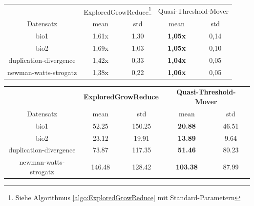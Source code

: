 \documentclass[12pt,a4paper,onecolumn,oneside,titlepage]{article}
\begin{document}
\begin{center}
\label{tab:qual_mover}
\begin{tabular}{c|c c|c c}
& \multicolumn{2}{c|}{ExploredGrowReduce\footnote{Siehe Algorithmus \ref{algo:ExploredGrowReduce} mit Standard-Parametern }} & \multicolumn{2}{c}{Quasi-Threshold-Mover} \\ 
Datensatz & \multicolumn{1}{c}{mean}  &  \multicolumn{1}{c|}{std} &  \multicolumn{1}{c}{mean} &  \multicolumn{1}{c}{std} \\ 
\hline 
bio1                    & 1,61x     & 1,30  & \textbf{1,05x}    & 0,14 \\ 
bio2                    & 1,69x     & 1,03  & \textbf{1,05x}    & 0,10 \\ 
duplication-divergence  & 1,42x     & 0,33  & \textbf{1,04x}    & 0,05 \\ 
newman-watts-strogatz   & 1,38x     & 0,22  & \textbf{1,06x}    & 0,05 \\ 

\end{tabular} 
\end{center}

\begin{center}
\label{tab:size_mover}
\begin{tabular}{c|c c|c c}
 & \multicolumn{2}{c|}{\textbf{ExploredGrowReduce}} & \multicolumn{2}{c}{\textbf{Quasi-Threshold-Mover}} \\ 
Datensatz & \multicolumn{1}{c}{mean}  &  \multicolumn{1}{c|}{std} &  \multicolumn{1}{c}{mean} &  \multicolumn{1}{c}{std} \\ 
\hline 
bio1 & 52.25  & 150.25 & \textbf{20.88} & 46.51 \\ 
bio2 & 23.12 & 19.91 & \textbf{13.89} & 9.64 \\ 
duplication-divergence & 73.87 & 117.35 & \textbf{51.46} & 80.23 \\ 
newman-watts-strogatz & 146.48 & 128.42 & \textbf{103.38} & 87.99 \\ 

\end{tabular} 
\end{center}
\end{document}

